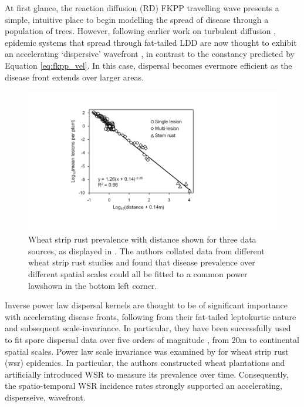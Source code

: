At first glance, the reaction diffusion (RD) FKPP travelling wave presents a simple, 
intuitive place to begin modelling the spread of disease through a population of trees.
However, following earlier work on turbulent diffusion \cite{scherm1996velocity},
epidemic systems that spread through fat-tailed LDD are now thought to exhibit an accelerating `dispersive' 
wavefront \cite{pybus2012unifying, cowger2005velocity},
in contrast to the constancy predicted by Equation \ref{eq:fkpp_vel}. In this case,
dispersal becomes evermore efficient as the disease front extends over larger areas.

\begin{figure}
    \centering
    \includegraphics[scale=0.3]{chapter2/figures/multi-spread.pdf}
    \caption{Wheat strip rust prevalence with distance shown for three data sources, as displayed in \cite{severns2019consequences}.
             The authors collated data from different wheat strip rust studies and found that disease prevalence 
             over different spatial scales could all be fitted to a common power law\textemdash shown in the bottom left corner. 
    }
    \label{fig:WSR-prevelance}
\end{figure}

Inverse power law dispersal kernels are thought to be of significant importance with accelerating disease
fronts, following from their fat-tailed leptokurtic nature and subsequent scale-invariance. In particular,
they have been successfully used to fit spore dispersal data over five orders of magnitude \cite{mundt2009long}, 
from $20\mathrm{m}$ to continental spatial scales.
Power law scale invariance was examined by \cite{severns2019consequences} for wheat strip rust (\acrshort{wsr}) epidemics. 
In particular, the authors constructed wheat plantations and artificially introduced WSR to measure its prevalence over time. 
Consequently, the spatio-temporal WSR incidence rates strongly supported
an accelerating, disperseive, wavefront. 

